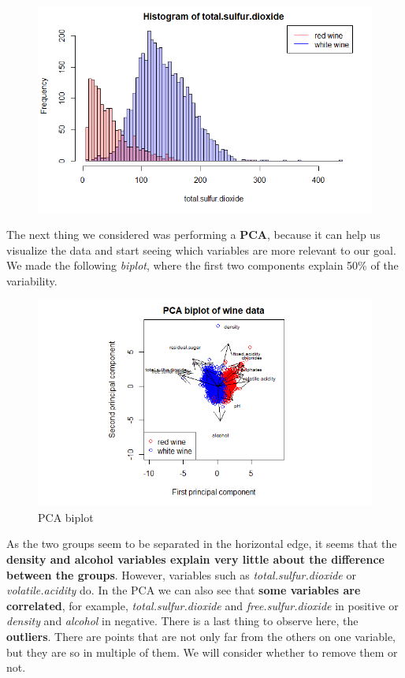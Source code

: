 \documentclass[10pt]{article}
\begin{document}
\begin{figure}[H]
\includegraphics[scale=0.4]{histogram_of_totalsulfurdioxide}
\end{figure}
The next thing we considered was performing a \textbf{PCA}, because it can help us visualize the data and start seeing which variables are more relevant to our goal. We made the following \textit{biplot}, where the first two components explain 50\% of the variability.
\begin{figure}[H]
\centering
\caption{PCA biplot}
\includegraphics[scale=0.75]{PCA_biplot}
\end{figure}
As the two groups seem to be separated in the horizontal edge, it seems that the \textbf{density and alcohol variables explain very little about the difference between the groups}. However, variables such as \textit{total.sulfur.dioxide} or \textit{volatile.acidity} do. In the PCA we can also see that \textbf{some variables are correlated}, for example, \textit{total.sulfur.dioxide} and \textit{free.sulfur.dioxide} in positive or \textit{density} and \textit{alcohol} in negative. There is a last thing to observe here, the \textbf{outliers}. There are points that are not only far from the others on one variable, but they are so in multiple of them. We will consider whether to remove them or not.   \\
\end{document}
